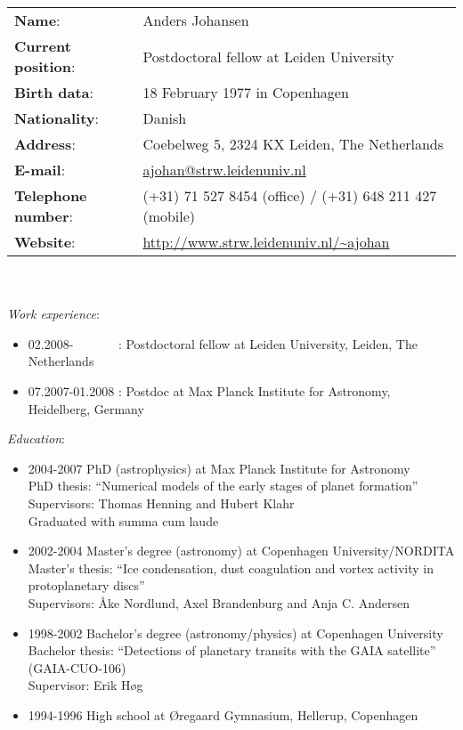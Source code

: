 \documentclass{article}
\begin{document}
\begin{tabular}{ll}
  \textbf{Name}: & Anders Johansen \\
  \textbf{Current position}: & Postdoctoral fellow at Leiden University\\
  \textbf{Birth data}: & 18 February 1977 in Copenhagen \\
  \textbf{Nationality}: & Danish \\
  \textbf{Address}: & Coebelweg 5, 2324 KX Leiden, The Netherlands\\
  \textbf{E-mail}: & \url{ajohan@strw.leidenuniv.nl} \\
  \textbf{Telephone number}: &
   (+31) 71 527 8454 (office) / (+31) 648 211 427 (mobile) \\
  \textbf{Website}: &
  \url{http://www.strw.leidenuniv.nl/~ajohan}
\end{tabular}
\vspace{0.3cm}
\\ \\
{\it Work experience}:
\begin{itemize}
  \item 02.2008-\textcolor{white}{01.2010} : Postdoctoral fellow at Leiden
    University, Leiden, The Netherlands
  \item 07.2007-01.2008 : Postdoc at Max Planck Institute for Astronomy,
  Heidelberg, Germany
\end{itemize}
{\it Education}:
\begin{itemize}
  \item 2004-2007 PhD (astrophysics) at Max Planck Institute for Astronomy\\
    PhD thesis: ``Numerical models of the early stages of planet formation''\\
    Supervisors: Thomas Henning and Hubert Klahr\\
    Graduated with summa cum laude
  \item 2002-2004 Master's degree (astronomy) at Copenhagen University/NORDITA\\
    Master's thesis: ``Ice condensation, dust coagulation and vortex activity in
    protoplanetary discs''\\
    Supervisors: \AA ke Nordlund, Axel Brandenburg and Anja C.  Andersen
  \item 1998-2002 Bachelor's degree (astronomy/physics) at Copenhagen
    University\\
    Bachelor thesis: ``Detections of planetary transits with the GAIA
    satellite'' (GAIA-CUO-106)\\
    Supervisor: Erik H\o g
  \item 1994-1996 High school at \O regaard Gymnasium, Hellerup, Copenhagen\\
\end{itemize}
\end{document}
